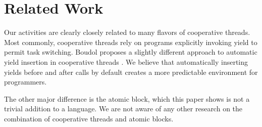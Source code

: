 \documentclass[acmsmall,anonymous,review]{acmart}\settopmatter{printfolios=true,printccs=false,printacmref=false}
\begin{document}




\section{Related Work}

Our activities are clearly closely related to many flavors of cooperative threads.
Most commonly, cooperative threads rely on programs explicitly invoking yield to permit task switching.
Boudol proposes a slightly different approach to automatic yield insertion in cooperative threads \cite{Boudol2007}.
We believe that automatically inserting yields before and after calls by default creates a more predictable environment for programmers.

The other major difference is the atomic block, which this paper shows is not a trivial addition to a language.
We are not aware of any other research on the combination of cooperative threads and atomic blocks.
\end{document}

